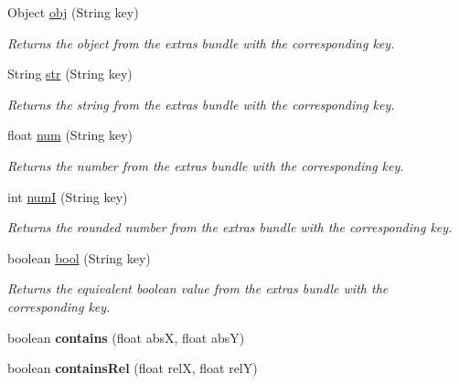 \begin{DoxyCompactItemize}
Object \hyperlink{classhype_1_1drawable_1_1_h_drawable_ae9ef9be1550351bb13884016ccc755f1}{obj} (String key)
\begin{DoxyCompactList}\small\item\em Returns the object from the {\itshape extras bundle} with the corresponding key. \end{DoxyCompactList}\item 
String \hyperlink{classhype_1_1drawable_1_1_h_drawable_a0d2393ad2936ee21fbb73fe8044f8c03}{str} (String key)
\begin{DoxyCompactList}\small\item\em Returns the string from the {\itshape extras bundle} with the corresponding key. \end{DoxyCompactList}\item 
float \hyperlink{classhype_1_1drawable_1_1_h_drawable_aaafb5307820159466ebf60658c7a325d}{num} (String key)
\begin{DoxyCompactList}\small\item\em Returns the number from the {\itshape extras bundle} with the corresponding key. \end{DoxyCompactList}\item 
int \hyperlink{classhype_1_1drawable_1_1_h_drawable_a78a4cb7304e24e1706d9f23d0a387b43}{num\-I} (String key)
\begin{DoxyCompactList}\small\item\em Returns the rounded number from the {\itshape extras bundle} with the corresponding key. \end{DoxyCompactList}\item 
boolean \hyperlink{classhype_1_1drawable_1_1_h_drawable_a138a8d2253dbfccb39889cb01b452f7c}{bool} (String key)
\begin{DoxyCompactList}\small\item\em Returns the equivalent boolean value from the {\itshape extras bundle} with the corresponding key. \end{DoxyCompactList}\item 
\hypertarget{classhype_1_1drawable_1_1_h_drawable_a6662671b3f2c3f96cdd8883e0eb21fd6}{boolean {\bfseries contains} (float abs\-X, float abs\-Y)}\label{classhype_1_1drawable_1_1_h_drawable_a6662671b3f2c3f96cdd8883e0eb21fd6}

\item 
\hypertarget{classhype_1_1drawable_1_1_h_drawable_a40eaa02f8f52fc6891d77affe8b8f146}{boolean {\bfseries contains\-Rel} (float rel\-X, float rel\-Y)}\label{classhype_1_1drawable_1_1_h_drawable_a40eaa02f8f52fc6891d77affe8b8f146}


\end{DoxyCompactItemize}
